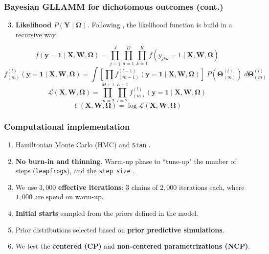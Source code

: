 \documentclass[nonav,sleutel]{beamer}
\begin{document}
	\begin{frame}
		\frametitle{Bayesian GLLAMM for dichotomous outcomes (cont.)}
		\begin{enumerate}
			\setcounter{enumi}{2}
			\item \textbf{Likelihood} $P( \mathbf{Y} \; | \; \pmb{\Omega} )$.
			Following \citet{Rabe_et_al_2004a}, the likelihood function is build in a recursive way. 
		\end{enumerate}
		\vspace{0.3cm} \begin{equation} \label{eq:lik1}
			f \left( \mathbf{y}=\mathbf{1} \; | \; \mathbf{X}, \mathbf{W}, \pmb{\Omega} \right) = \prod_{j=1}^{J} \prod_{d=1}^{D} \prod_{k=1}^{K} f \left( y_{jkd}=1 \; | \; \mathbf{X}, \mathbf{W}, \pmb{\Omega} \right)
		\end{equation}
		\begin{equation} \label{eq:lik2}
			f^{(l)}_{(m)} \left( \mathbf{y}=\mathbf{1} \; | \; \mathbf{X}, \mathbf{W}, \pmb{\Omega} \right) = \int \left[ \prod f^{(l-1)}_{(m-1)} \left( \mathbf{y}=\mathbf{1} \; | \; \mathbf{X}, \mathbf{W}, \pmb{\Omega} \right) \right] \; P( \pmb{\Theta}^{(l)}_{(m)} ) \; d\pmb{\Theta}^{(l)}_{(m)}
		\end{equation}
		\begin{equation} \label{eq:lik3}
			\mathcal{L}(\mathbf{X}, \mathbf{W}, \pmb{\Omega}) = \prod_{m=2}^{M+1} \prod_{l=2}^{L+1} f^{(l)}_{(m)} \left( \mathbf{y}=\mathbf{1} \; | \; \mathbf{X}, \mathbf{W}, \pmb{\Omega} \right)
		\end{equation}
		\begin{equation} \label{eq:loglik}
			\ell(\mathbf{X}, \mathbf{W}, \pmb{\Omega}) = \log \mathcal{L}(\mathbf{X}, \mathbf{W}, \pmb{\Omega})
		\end{equation}
	\end{frame}
	\begin{frame}
		\frametitle{Computational implementation}
		\begin{enumerate}
			\item Hamiltonian Monte Carlo (HMC) and \texttt{Stan} \cite{Stan2020}.
			\item \textbf{No burn-in and thinning}. Warm-up phase to ``tune-up" the number of steps (\texttt{leapfrogs}), and the \texttt{step size} \cite{Stan2020}.
			\item We use $3,000$ \textbf{effective iterations}: $3$ chains of $2,000$ iterations each, where $1,000$ are spend on warm-up.
			\item \textbf{Initial starts} sampled from the priors defined in the model.
			\item Prior distributions selected based on \textbf{prior predictive simulations}.
			\item We test the \textbf{centered (CP)} and \textbf{non-centered parametrizations (NCP)}.
		\end{enumerate}
	\end{frame}
\end{document}
